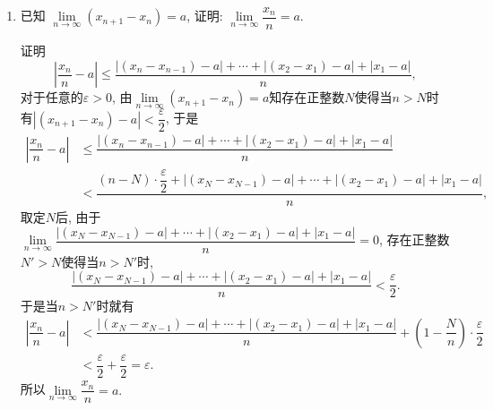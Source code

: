 \documentclass[UTF8,a4paper,20pt]{article}
\begin{document}
\begin{enumerate}
\item {\large\kaishu 已知 $\lim\limits_{n \to \infty}(x_{n+1}-x_n)=a$, 证明: $\lim\limits_{n \to \infty}\dfrac{x_n}{n}=a.$}

{\heiti 证明}\\
\[
\left|\dfrac{x_n}{n}-a\right|\leqslant\dfrac{|(x_n-x_{n-1})-a|+\cdots+|(x_2-x_1)-a|+|x_1-a|}{n},
\]
对于任意的$\varepsilon>0$, 由$\lim\limits_{n \to \infty}(x_{n+1}-x_n)=a$知存在正整数$N$使得当$n>N$时有$|(x_{n+1}-x_n)-a|<\dfrac{\varepsilon}{2}$, 于是
\begin{equation*}
\begin{split}
\left|\dfrac{x_n}{n}-a\right|&\leqslant\dfrac{|(x_n-x_{n-1})-a|+\cdots+|(x_2-x_1)-a|+|x_1-a|}{n}\\&<\dfrac{(n-N)\cdot\dfrac{\varepsilon}{2}+|(x_N-x_{N-1})-a|+\cdots+|(x_2-x_1)-a|+|x_1-a|}{n},
\end{split}
\end{equation*}
取定$N$后, 由于$\lim\limits_{n \to \infty}\dfrac{|(x_N-x_{N-1})-a|+\cdots+|(x_2-x_1)-a|+|x_1-a|}{n}=0$, 存在正整数$N'>N$使得当$n>N'$时,
\[
\dfrac{|(x_N-x_{N-1})-a|+\cdots+|(x_2-x_1)-a|+|x_1-a|}{n}<\dfrac{\varepsilon}{2}.
\]
于是当$n>N'$时就有
\begin{equation*}
\begin{split}
\left|\dfrac{x_n}{n}-a\right|&<\dfrac{|(x_N-x_{N-1})-a|+\cdots+|(x_2-x_1)-a|+|x_1-a|}{n}+(1-\dfrac{N}{n})\cdot\dfrac{\varepsilon}{2}\\&<\dfrac{\varepsilon}{2}+\dfrac{\varepsilon}{2}=\varepsilon.
\end{split}
\end{equation*}
所以$\lim\limits_{n \to \infty}\dfrac{x_n}{n}=a.$
\end{enumerate}

\clearpage
\end{document}
